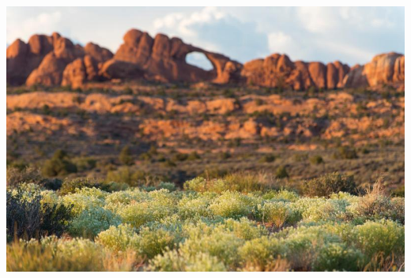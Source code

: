 \documentclass[10pt,ignorenonframetext,]{beamer}
\begin{document}
\begin{frame}

\centerline{\includegraphics[height=7in]{Figures/grass_landscape_arch.jpg}}

\end{frame}
\end{document}
